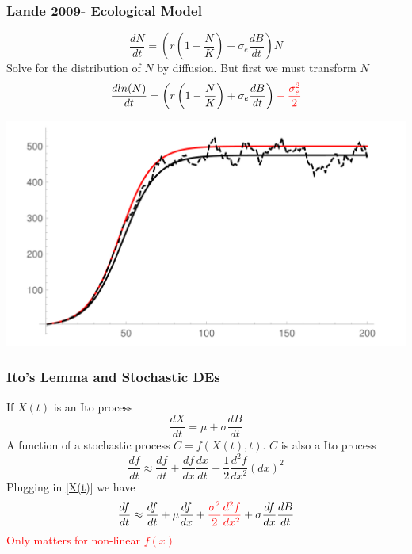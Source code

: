 \documentclass{beamer}
\begin{document}
\begin{frame}
\frametitle{Lande 2009- Ecological Model}
\begin{minipage}{0.45\textwidth}
\scriptsize
\begin{equation*}
\frac{dN}{dt}=\left(r\left(1-\frac{N}{K}\right)+\sigma_e\frac{dB}{dt}\right)N
\end{equation*}
Solve for the distribution of \(N\) by diffusion.\newline\newline
But first we must transform \(N\)
\begin{equation*}
\frac{dln(N)}{dt}=\left(r\left(1-\frac{N}{K}\right)+\sigma_e\frac{dB}{dt}\right)\begingroup\color{red}-\frac{\sigma_e^2}{2}\endgroup
\end{equation*}
\normalsize
\end{minipage}
\begin{minipage}{0.45\textwidth}
\includegraphics[width=1.2\columnwidth]{Itoprocess.pdf}
\end{minipage}
\end{frame}

\begin{frame}
\frametitle{Ito's Lemma and Stochastic DEs}
If \(X(t)\) is an Ito process
\begin{equation}
\label{X(t)}
\frac{dX}{dt}=\mu+\sigma\frac{dB}{dt}
\end{equation}
A function of a stochastic process $C=f(X(t),t)$.  \(C\) is also a Ito process
\begin{equation}
\frac{df}{dt}\approx\frac{df}{dt}+\frac{df}{dx}\frac{dx}{dt}+\frac{1}{2}\frac{d^2f}{dx^2}(dx)^2
\end{equation}
Plugging in \eqref{X(t)} we have
\begin{equation}
\frac{df}{dt}\approx\frac{df}{dt}+\mu\frac{df}{dx}+\begingroup\color{red}\frac{\sigma^2}{2}\frac{d^2f}{dx^2}\endgroup+\sigma\frac{df}{dx}\frac{dB}{dt}
\end{equation}
\textcolor{red}{Only matters for non-linear \(f(x)\)}
\end{frame}
\end{document}

